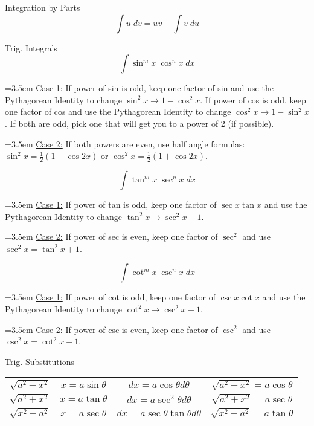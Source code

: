 \documentclass[12pt]{article}
\numberwithin{equation}{subsection}
\begin{document}
\begin{flushleft}
Integration by Parts
\begin{equation}
\int u\; dv = uv - \int v\; du
\end{equation}

Trig. Integrals
\begin{equation}
\int \sin^{m}{x}\; \cos^{n}{x}\; dx
\end{equation}


\hangindent=3.5em
\underline{Case 1:} If power of sin is odd, keep one factor of sin and use the Pythagorean Identity to change $\sin^{2}{x}\rightarrow 1-\cos^{2}{x}$. If power of cos is odd, keep one factor of cos and use the Pythagorean Identity to change $\cos^{2}{x}\rightarrow 1-\sin^{2}{x}$. If both are odd, pick one that will get you to a power of 2 (if possible).\\
\medskip 

\hangindent=3.5em
\underline{Case 2:} If both powers are even, use half angle formulas: $\sin^{2}{x}=\frac{1}{2}(1-\cos{2x})$ or $\cos^{2}{x}=\frac{1}{2}(1+\cos{2x})$.

\begin{equation}
\int \tan^{m}{x}\; \sec^{n}{x}\; dx
\end{equation}

\hangindent=3.5em
\underline{Case 1:} If power of tan is odd, keep one factor of $\sec{x}\tan{x}$ and use the Pythagorean Identity to change $\tan^{2}{x}\rightarrow \sec^{2}{x}-1$. 
\medskip 

\hangindent=3.5em
\underline{Case 2:} If power of sec is even, keep one factor of $\sec^{2}$ and use $\sec^{2}{x} = \tan^{2}{x}+1$.

\begin{equation}
\int \cot^{m}{x}\; \csc^{n}{x}\; dx
\end{equation}

\hangindent=3.5em
\underline{Case 1:} If power of cot is odd, keep one factor of $\csc{x}\cot{x}$ and use the Pythagorean Identity to change $\cot^{2}{x}\rightarrow \csc^{2}{x}-1$. 
\medskip 

\hangindent=3.5em
\underline{Case 2:} If power of csc is even, keep one factor of $\csc^{2}$ and use $\csc^{2}{x} = \cot^{2}{x}+1$.
\bigskip

Trig. Substitutions
\begin{center}
\begin{tabular}{cccc}

$\sqrt{a^{2}-x^{2}}$ \smallskip & $x=a\sin{\theta}$ \smallskip & $dx=a\cos{\theta}d\theta$ \smallskip & $\sqrt{a^{2}-x^{2}}=a\cos{\theta}$ \smallskip \\
$\sqrt{a^{2}+x^{2}}$ \smallskip & $x=a\tan{\theta}$ \smallskip & $dx=a\sec^{2}{\theta}d\theta$ \smallskip & $\sqrt{a^{2}+x^{2}}=a\sec{\theta}$ \smallskip \\
$\sqrt{x^{2}-a^{2}}$ & $x=a\sec{\theta}$ & $dx=a\sec{\theta}\tan{\theta}d\theta$ & $\sqrt{x^{2}-a^{2}}=a\tan{\theta}$\\


\end{tabular}
\end{center}
\end{flushleft}
\end{document}
